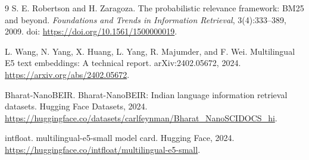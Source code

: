 \documentclass[10pt]{article}
\begin{document}
\begin{thebibliography}{9}
S. E. Robertson and H. Zaragoza.
\newblock The probabilistic relevance framework: BM25 and beyond.
\newblock \emph{Foundations and Trends in Information Retrieval}, 3(4):333--389, 2009.
\newblock doi: \url{https://doi.org/10.1561/1500000019}.

L. Wang, N. Yang, X. Huang, L. Yang, R. Majumder, and F. Wei.
\newblock Multilingual E5 text embeddings: A technical report.
\newblock arXiv:2402.05672, 2024. \url{https://arxiv.org/abs/2402.05672}.

Bharat-NanoBEIR.
\newblock Bharat-NanoBEIR: Indian language information retrieval datasets.
\newblock Hugging Face Datasets, 2024. \url{https://huggingface.co/datasets/carlfeynman/Bharat_NanoSCIDOCS_hi}.

intfloat.
\newblock multilingual-e5-small model card.
\newblock Hugging Face, 2024. \url{https://huggingface.co/intfloat/multilingual-e5-small}.
\end{thebibliography}
\end{document}
